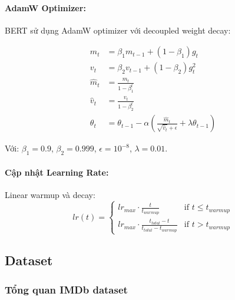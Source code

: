 \paragraph{AdamW Optimizer:}

BERT sử dụng AdamW optimizer với decoupled weight decay:

\begin{align}
m_t &= \beta_1 m_{t-1} + (1 - \beta_1) g_t \\
v_t &= \beta_2 v_{t-1} + (1 - \beta_2) g_t^2 \\
\hat{m}_t &= \frac{m_t}{1 - \beta_1^t} \\
\hat{v}_t &= \frac{v_t}{1 - \beta_2^t} \\
\theta_t &= \theta_{t-1} - \alpha \left(\frac{\hat{m}_t}{\sqrt{\hat{v}_t} + \epsilon} + \lambda \theta_{t-1}\right)
\end{align}

Với: $\beta_1 = 0.9$, $\beta_2 = 0.999$, $\epsilon = 10^{-8}$, $\lambda = 0.01$.

\paragraph{Cập nhật Learning Rate:}
Linear warmup và decay:
\begin{equation}
lr(t) = \begin{cases}
lr_{max} \cdot \frac{t}{t_{warmup}} & \text{if } t \leq t_{warmup} \\
lr_{max} \cdot \frac{t_{total} - t}{t_{total} - t_{warmup}} & \text{if } t > t_{warmup}
\end{cases}
\label{eq:lr_schedule}
\end{equation}

\subsection{Dataset}
\label{subsec:dataset_preprocessing}

\subsubsection{Tổng quan IMDb dataset}
\label{subsubsec:imdb_statistics}

